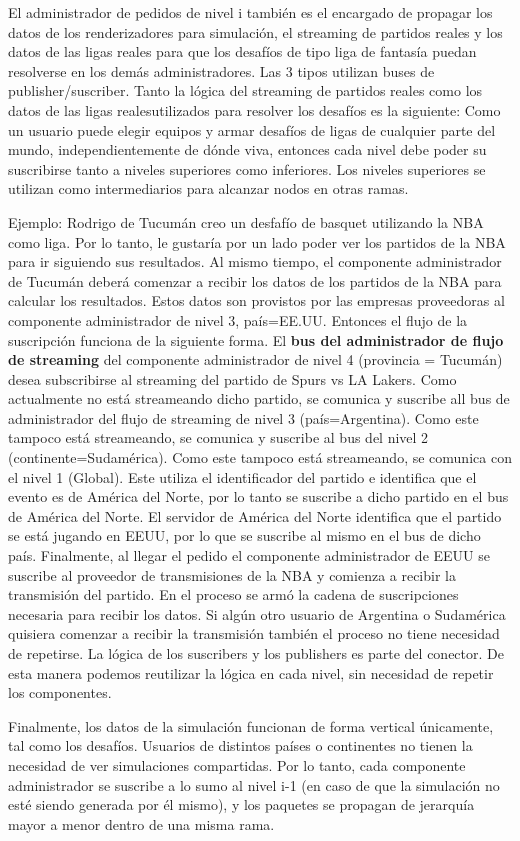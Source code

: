 El administrador de pedidos de nivel i también es el encargado de propagar los datos de los renderizadores para simulación, el streaming de partidos reales y los datos de las ligas reales para que los desafíos de tipo liga de fantasía puedan resolverse
en los demás administradores.
Las 3 tipos utilizan buses de publisher/suscriber.
Tanto la lógica del streaming de partidos reales como los datos de las ligas realesutilizados para resolver los desafíos es la siguiente: Como un usuario puede elegir equipos y armar desafíos de ligas de cualquier parte del mundo, independientemente de dónde viva, entonces cada nivel debe poder su suscribirse tanto a niveles superiores como inferiores. Los niveles superiores se utilizan como intermediarios para alcanzar nodos en otras ramas.

Ejemplo: Rodrigo de Tucumán creo un desfafío de basquet utilizando la NBA como liga. Por lo tanto, le gustaría por un
lado poder ver los partidos de la NBA para ir siguiendo sus resultados. Al mismo tiempo, el componente administrador
de Tucumán deberá comenzar a recibir los datos de los partidos de la NBA para calcular los resultados. Estos datos
son provistos por las empresas proveedoras al componente administrador de nivel 3, país=EE.UU.
Entonces el flujo de la suscripción funciona de la siguiente forma. El \textbf{bus del administrador de flujo de streaming} del componente administrador de nivel 4 (provincia = Tucumán)
desea subscribirse al streaming del partido de Spurs vs LA Lakers. Como actualmente no está streameando dicho partido,
se comunica y suscribe all bus de administrador del flujo de streaming de nivel 3 (país=Argentina). Como este tampoco está streameando, se comunica y suscribe al bus del nivel 2 (continente=Sudamérica). Como este tampoco está streameando, se
comunica con el  nivel 1 (Global). Este utiliza el identificador del partido e identifica que el evento es de América del Norte, por lo tanto
se suscribe a dicho partido en el bus de América del Norte. El servidor de América del Norte identifica que el partido se
está jugando en EEUU, por lo que se suscribe al mismo en el bus de dicho país. Finalmente, al llegar el pedido el componente
administrador de EEUU se suscribe al proveedor de transmisiones de la NBA y comienza a recibir la transmisión del partido.
En el proceso se armó la cadena de suscripciones necesaria para recibir los datos. Si algún otro usuario de Argentina o Sudamérica quisiera comenzar a recibir la transmisión también el proceso no tiene necesidad de repetirse.
La lógica de los suscribers y los publishers es parte del conector. De esta manera podemos reutilizar la lógica en cada
nivel, sin necesidad de repetir los componentes.

Finalmente, los datos de la simulación funcionan de forma vertical únicamente, tal como los desafíos. Usuarios de distintos países
o continentes no tienen la necesidad de ver simulaciones compartidas. Por lo tanto, cada componente administrador
se suscribe a lo sumo al nivel i-1 (en caso de que la simulación no esté siendo generada por él mismo), y los paquetes
se propagan de jerarquía mayor a menor dentro de una misma rama.
